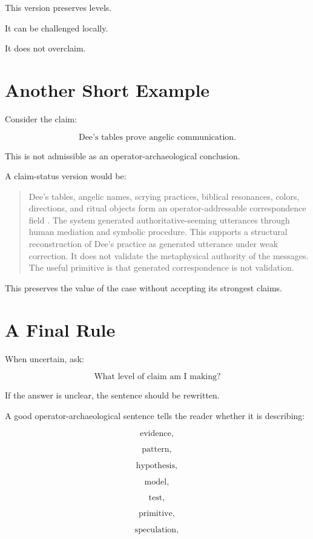 \documentclass[11pt]{book}
\begin{document}
This version preserves levels.

It can be challenged locally.

It does not overclaim.

\section{Another Short Example}

Consider the claim:

\[
\text{Dee's tables prove angelic communication.}
\]

This is not admissible as an operator-archaeological conclusion.

A claim-status version would be:

\begin{quote}
Dee’s tables, angelic names, scrying practices, biblical resonances, colors, directions, and ritual objects form an operator-addressable correspondence field \cite{DeeCasaubon1659TrueFaithfulRelation,Yates1964GiordanoBruno}. The system generated authoritative-seeming utterances through human mediation and symbolic procedure. This supports a structural reconstruction of Dee's practice as generated utterance under weak correction. It does not validate the metaphysical authority of the messages. The useful primitive is that generated correspondence is not validation.
\end{quote}

This preserves the value of the case without accepting its strongest claims.

\section{A Final Rule}

When uncertain, ask:

\[
\text{What level of claim am I making?}
\]

If the answer is unclear, the sentence should be rewritten.

A good operator-archaeological sentence tells the reader whether it is describing:

\[
\text{evidence},
\]

\[
\text{pattern},
\]

\[
\text{hypothesis},
\]

\[
\text{model},
\]

\[
\text{test},
\]

\[
\text{primitive},
\]

\[
\text{speculation},
\]
\end{document}
